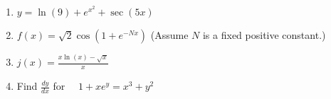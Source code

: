\documentclass[12pt]{article}
\renewcommand{\emph}[1]{\textsf{\textbf{#1}}}
\newcounter{probcount}
\newcounter{subprobcount}
\newenvironment{subproblems}{%
\begin{enumerate}%
\setcounter{enumi}{\value{subprobcount}}%
\renewcommand{\theenumi}{\emph{\alph{enumi}}}}%
{\setcounter{subprobcount}{\value{enumi}}\end{enumerate}}
\newcommand{\ds}{\displaystyle}
\begin{document}
\begin{subproblems}
\item $\ds y=\ln(9)+e^{x^2} + \sec(5x) $\\
\vfill



\vfill 
\newpage
\item $\ds f(x)=\sqrt{2} \cos(1+e^{-Nx})$ (Assume $N$ is a fixed positive constant.)
\vfill

\item $\ds j(x)=\frac{x \ln(x) -\sqrt{x}}{x}$\\
\vfill



\item Find $\ds \frac{dy}{dx}$ for  $\quad \ds 1+xe^y= x^3+y^2$\\
\vfill

\end{subproblems}
\end{document}

